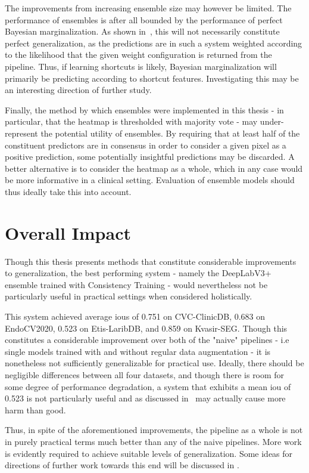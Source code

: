     The improvements from increasing ensemble size may however be limited. The performance of ensembles is after all bounded by the performance of perfect Bayesian marginalization. As shown in~, this will not necessarily constitute perfect generalization, as the predictions are in such a system weighted according to the likelihood that the given weight configuration is returned from the pipeline. Thus, if learning shortcuts is likely, Bayesian marginalization will primarily be predicting according to shortcut features. Investigating this may be an interesting direction of further study.
    
    Finally, the method by which ensembles were implemented in this thesis - in particular, that the heatmap is thresholded with majority vote - may under-represent the potential utility of ensembles. By requiring that at least half of the constituent predictors are in consensus in order to consider a given pixel as a positive prediction, some potentially insightful predictions may be discarded. A better alternative is to consider the heatmap as a whole, which in any case would be more informative in a clinical setting. Evaluation of ensemble models should thus ideally take this into account. 


\section{Overall Impact}
Though this thesis presents methods that constitute considerable improvements to generalization, the best performing system - namely the DeepLabV3+ ensemble trained with Consistency Training -  would nevertheless not be particularly useful in practical settings when considered holistically.

This system achieved average \glspl{iou} of 0.751 on CVC-ClinicDB, 0.683 on EndoCV2020, 0.523 on Etis-LaribDB, and 0.859 on Kvasir-SEG. Though this constitutes a considerable improvement over both of the "naive" pipelines - i.e single models trained with and without regular data augmentation - it is nonetheless not sufficiently generalizable for practical use. Ideally, there should be negligible differences between all four datasets, and though there is room for some degree of performance degradation, a system that exhibits a mean \gls{iou} of 0.523 is not particularly useful and as discussed in~ may actually cause more harm than good. 

Thus, in spite of the aforementioned improvements, the pipeline as a whole is not in purely practical terms much better than any of the naive pipelines. More work is evidently required to achieve suitable levels of generalization. Some ideas for directions of further work towards this end will be discussed in . 

